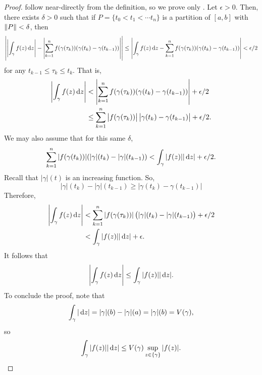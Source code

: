 	\begin{proof}
		 follow near-directly from the definition, so we prove only . Let $\epsilon > 0$. Then, there exists $\delta > 0$ such that if $P = \{ t_0 < t_1 < \cdots t_n \}$ is a partition of $[a,b]$ with $\left\lVert P\right\rVert < \delta$, then
		\[ \left| \left| \int_\gamma f(z) \dif z \right| - \left| \sum_{k=1}^n f(\gamma(\tau_k)) (\gamma(t_k) - \gamma(t_{k-1})) \right| \right| \le \left| \int_\gamma f(z) \dif z - \sum_{k=1}^n f(\gamma(\tau_k)) (\gamma(t_k) - \gamma(t_{k-1})) \right| < \epsilon/2 \]
		for any $t_{k-1} \le \tau_k \le t_k$.
		That is,
		\begin{align*}
			\left| \int_\gamma f(z) \dif z \right| &< \left| \sum_{k=1}^n f(\gamma(\tau_k)) (\gamma(t_k) - \gamma(t_{k-1})) \right| + \epsilon/2 \\
			&\le  \sum_{k=1}^n \left| f(\gamma(\tau_k)) \right| \left|\gamma(t_k) - \gamma(t_{k-1}) \right| + \epsilon/2.
		\end{align*}
		We may also assume that for this same $\delta$,
		\[ \sum_{k=1}^n |f(\gamma(t_k))| (|\gamma|(t_k) - |\gamma|(t_{k-1})) < \int_\gamma |f(z)| |\dif z| + \epsilon/2 . \]
		Recall that $|\gamma|(t)$ is an increasing function. So,
		\[ |\gamma|(t_k) - |\gamma|(t_{k-1}) \ge |\gamma(t_k) - \gamma(t_{k-1})| \]
		Therefore,
		\begin{align*}
			\left| \int_\gamma f(z) \dif z \right| &< \sum_{k=1}^n |f(\gamma(\tau_k))| \left( |\gamma|(t_k) - |\gamma|(t_{k-1}) \right) + \epsilon/2 \\
				&< \int_\gamma |f(z)| |\dif z| + \epsilon.
		\end{align*}
		It follows that
		\[ \left| \int_\gamma f(z) \dif z \right| \le \int_\gamma |f(z)| |\dif z|. \]
		To conclude the proof, note that
		\[ \int_\gamma |\dif z| = |\gamma|(b) - |\gamma|(a) = |\gamma|(b) = V(\gamma), \]
		so
		\[ \int_\gamma |f(z)| |\dif z| \le V(\gamma) \sup_{z \in \{\gamma\}} |f(z)|. \]
	\end{proof}

